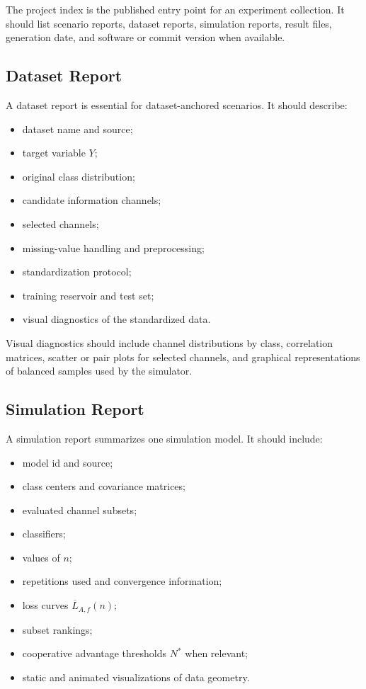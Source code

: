 \documentclass[11pt,a4paper]{article}
\begin{document}
The project index is the published entry point for an experiment collection. It should list scenario reports, dataset reports, simulation reports, result files, generation date, and software or commit version when available.

\subsection{Dataset Report}

A dataset report is essential for dataset-anchored scenarios. It should describe:
\begin{itemize}
    \item dataset name and source;
    \item target variable $Y$;
    \item original class distribution;
    \item candidate information channels;
    \item selected channels;
    \item missing-value handling and preprocessing;
    \item standardization protocol;
    \item training reservoir and test set;
    \item visual diagnostics of the standardized data.
\end{itemize}

Visual diagnostics should include channel distributions by class, correlation matrices, scatter or pair plots for selected channels, and graphical representations of balanced samples used by the simulator.

\subsection{Simulation Report}

A simulation report summarizes one simulation model. It should include:
\begin{itemize}
    \item model id and source;
    \item class centers and covariance matrices;
    \item evaluated channel subsets;
    \item classifiers;
    \item values of $n$;
    \item repetitions used and convergence information;
    \item loss curves $\overline{L}_{A,f}(n)$;
    \item subset rankings;
    \item cooperative advantage thresholds $N^*$ when relevant;
    \item static and animated visualizations of data geometry.
\end{itemize}
\end{document}
